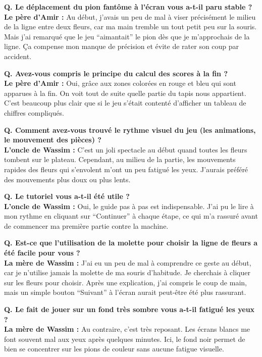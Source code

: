\documentclass[11pt,a4paper]{article}
\begin{document}
\begin{tcolorbox}[seniorbox, title={Le père d'Amir -- 68 ans, ancien cadre administratif}]
    \textbf{Q. Le déplacement du pion fantôme à l'écran vous a-t-il paru stable ?}\\
    \textbf{Le père d'Amir :} Au début, j'avais un peu de mal à viser précisément le milieu de la ligne entre deux fleurs, car ma main tremble un tout petit peu sur la souris. Mais j'ai remarqué que le jeu ``aimantait'' le pion dès que je m'approchais de la ligne. Ça compense mon manque de précision et évite de rater son coup par accident.

    \textbf{Q. Avez-vous compris le principe du calcul des scores à la fin ?}\\
    \textbf{Le père d'Amir :} Oui, grâce aux zones colorées en rouge et bleu qui sont apparues à la fin. On voit tout de suite quelle partie du tapis nous appartient. C'est beaucoup plus clair que si le jeu s'était contenté d'afficher un tableau de chiffres compliqués.
\end{tcolorbox}

\begin{tcolorbox}[seniorbox, title={L'oncle de Wassim -- 74 ans, ancien artisan électricien}]
    \textbf{Q. Comment avez-vous trouvé le rythme visuel du jeu (les animations, le mouvement des pièces) ?}\\
    \textbf{L'oncle de Wassim :} C'est un joli spectacle au début quand toutes les fleurs tombent sur le plateau. Cependant, au milieu de la partie, les mouvements rapides des fleurs qui s'envolent m'ont un peu fatigué les yeux. J'aurais préféré des mouvements plus doux ou plus lents.

    \textbf{Q. Le tutoriel vous a-t-il été utile ?}\\
    \textbf{L'oncle de Wassim :} Oui, le guide pas à pas est indispensable. J'ai pu le lire à mon rythme en cliquant sur ``Continuer'' à chaque étape, ce qui m'a rassuré avant de commencer ma première partie contre la machine.
\end{tcolorbox}

\begin{tcolorbox}[seniorbox, title={La mère de Wassim -- 70 ans, retraitée de la fonction publique}]
    \textbf{Q. Est-ce que l'utilisation de la molette pour choisir la ligne de fleurs a été facile pour vous ?}\\
    \textbf{La mère de Wassim :} J'ai eu un peu de mal à comprendre ce geste au début, car je n'utilise jamais la molette de ma souris d'habitude. Je cherchais à cliquer sur les fleurs pour choisir. Après une explication, j'ai compris le coup de main, mais un simple bouton ``Suivant'' à l'écran aurait peut-être été plus rassurant.

    \textbf{Q. Le fait de jouer sur un fond très sombre vous a-t-il fatigué les yeux ?}\\
    \textbf{La mère de Wassim :} Au contraire, c'est très reposant. Les écrans blancs me font souvent mal aux yeux après quelques minutes. Ici, le fond noir permet de bien se concentrer sur les pions de couleur sans aucune fatigue visuelle.
\end{tcolorbox}
\end{document}
